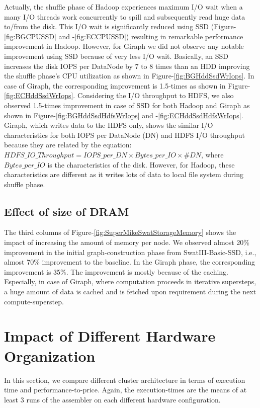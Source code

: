 \documentclass[10pt, conference, compsocconf]{IEEEtran}
\begin{document}
Actually, the shuffle phase of Hadoop experiences maximum I/O wait when a many I/O threads work concurrently to spill and subsequently read huge data to/from the disk. This I/O wait is significantly reduced using SSD (Figure-\ref{fig:BGCPUSSD} and -\ref{fig:ECCPUSSD}) resulting in remarkable performance improvement in Hadoop. However, for Giraph we did not observe any notable improvement using SSD because of very less I/O wait. Basically, an SSD increases the disk IOPS per DataNode by 7 to 8 times than an HDD improving the shuffle phase's CPU utilization as shown in Figure-\ref{fig:BGHddSsdWrIops}. In case of Giraph, the corresponding improvement is 1.5-times as shown in Figure-\ref{fig:ECHddSsdWrIops}. Considering the I/O throughput to HDFS, we also observed 1.5-times improvement in case of SSD for both Hadoop and Giraph as shown in Figure-\ref{fig:BGHddSsdHdfsWrIops} and -\ref{fig:ECHddSsdHdfsWrIops}. Giraph, which writes data to the HDFS only, shows the similar I/O characteristics  for both IOPS per DataNode (DN) and HDFS I/O throughput because they are related by the equation: $HDFS\_IO\_Throughput = IOPS\_per\_DN \times Bytes\_per\_IO \times \#DN$, where $Bytes\_per\_IO$ is the characteristics of the disk. However, for Hadoop, these characteristics are different as it writes lots of data to local file system during shuffle phase.

\subsection {Effect of size of DRAM} \label{EffectOfDRAM}
The third columns of Figure-\ref{fig:SuperMikeSwatStorageMemory} shows the impact of increasing the amount of memory per node. We observed almost 20\% improvement in the initial graph-construction phase from SwatIII-Basic-SSD, i.e., almost 70\% improvement to the baseline. In the Giraph phase, the corresponding improvement is 35\%. The improvement is mostly because of the caching. Especially, in case of Giraph, where computation proceeds in iterative supersteps, a huge amount of data is cached and is fetched upon requirement during the next compute-superstep.

\section {Impact of Different Hardware Organization} \label{ComparingDifferentArchitecturalBalance}

In this section, we compare different cluster architecture in terms of execution time and performance-to-price. Again, the execution-times are the means of at least 3 runs of the assembler on each different hardware configuration.
\end{document}
